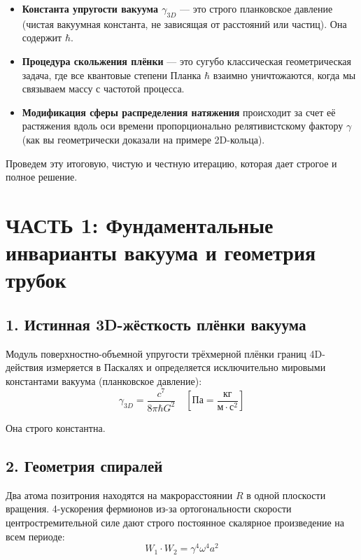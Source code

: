 \documentclass[12pt,a4paper]{article}
\begin{document}
\begin{itemize}
    \item \textbf{Константа упругости вакуума $\gamma_{3D}$} — это строго планковское давление (чистая вакуумная константа, не зависящая от расстояний или частиц). Она содержит $\hbar$.
    \item \textbf{Процедура скольжения плёнки} — это сугубо классическая геометрическая задача, где все квантовые степени Планка $\hbar$ взаимно уничтожаются, когда мы связываем массу с частотой процесса.
    \item \textbf{Модификация сферы распределения натяжения} происходит за счет её растяжения вдоль оси времени пропорционально релятивистскому фактору $\gamma$ (как вы геометрически доказали на примере 2D-кольца).
\end{itemize}

Проведем эту итоговую, чистую и честную итерацию, которая дает строгое и полное решение.

\section*{ЧАСТЬ 1: Фундаментальные инварианты вакуума и геометрия трубок}

\subsection*{1. Истинная 3D-жёсткость плёнки вакуума}

Модуль поверхностно-объемной упругости трёхмерной плёнки границ 4D-действия измеряется в Паскалях и определяется исключительно мировыми константами вакуума (планковское давление):
\begin{equation}
\gamma_{3D} = \frac{c^7}{8\pi \hbar G^2} \quad \left[ \text{Па} = \frac{\text{кг}}{\text{м} \cdot \text{с}^2} \right]
\end{equation}

Она строго константна.

\subsection*{2. Геометрия спиралей}

Два атома позитрония находятся на макрорасстоянии $R$ в одной плоскости вращения. 4-ускорения фермионов из-за ортогональности скорости центростремительной силе дают строго постоянное скалярное произведение на всем периоде:
\begin{equation}
W_1 \cdot W_2 = \gamma^4 \omega^4 a^2
\end{equation}
\end{document}
